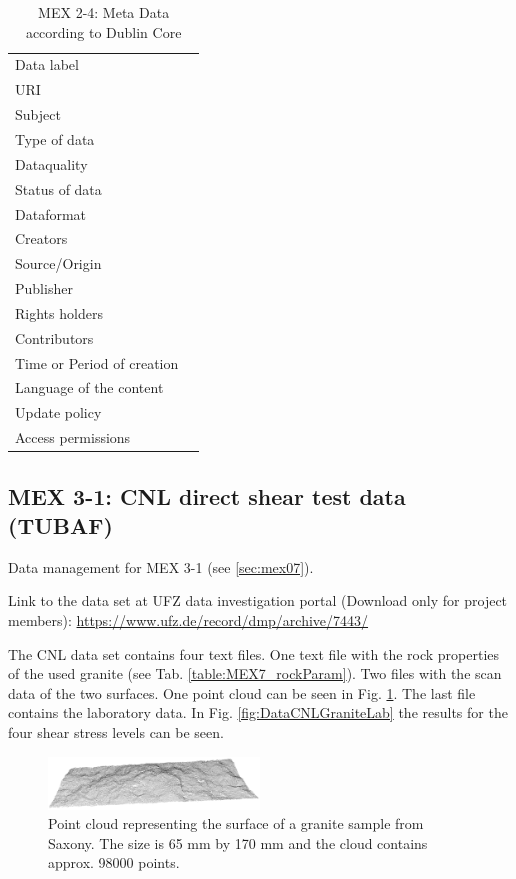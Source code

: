 \begin{table}[!ht]
\caption{MEX 2-4: Meta Data according to Dublin Core}
\label{tab:dms-mex2-4}
\small
\begin{tabular}{R{3cm}|L{7cm}}
\hline
%
Data label &  \\
URI &  \\
Subject  &  \\
Type of data  &  \\
Dataquality  &  \\
Status of data  &  \\
Dataformat  & \\
Creators  &  \\
Source/Origin &  \\
Publisher  &  \\
Rights holders &  \\
Contributors &  \\
Time or Period of creation &  \\
Language of the content &  \\
Update policy &  \\
Access permissions &  \\
%
\hline
\end{tabular}
\end{table}

\subsection{MEX 3-1: CNL direct shear test data (TUBAF)}\label{DataManMex3-1CNL}

Data management for MEX 3-1 (see \ref{sec:mex07}).

Link to the data set at UFZ data investigation portal (Download only for project members):
\url{https://www.ufz.de/record/dmp/archive/7443/}

The CNL data set contains four text files. One text file with the rock properties of the used granite (see Tab. \ref{table:MEX7_rockParam}). Two files with the scan data of the two surfaces. One point cloud can be seen in Fig. \ref{fig:DataCNLGranitePointCloud}. The last file contains the laboratory data. In Fig. \ref{fig:DataCNLGraniteLab} the results for the four shear stress levels can be seen.

\begin{figure}[!ht]
\begin{center}
\includegraphics[width=0.5\textwidth]{./figures/MEX7_Point_cloud.png}
\end{center}
\caption{Point cloud representing the surface of a granite sample from Saxony. The size is 65 mm by 170 mm and the cloud contains approx. 98000 points.}
\label{fig:DataCNLGranitePointCloud}
\end{figure}

